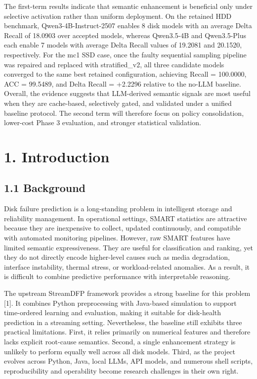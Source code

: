 \documentclass[
  11pt,
  a4paper]{article}
\begin{document}
The first-term results indicate that semantic enhancement is beneficial
only under selective activation rather than uniform deployment. On the
retained HDD benchmark, Qwen3-4B-Instruct-2507 enables 8 disk models
with an average Delta Recall of 18.0903 over accepted models, whereas
Qwen3.5-4B and Qwen3.5-Plus each enable 7 models with average Delta
Recall values of 19.2081 and 20.1520, respectively. For the mc1 SSD
case, once the faulty sequential sampling pipeline was repaired and
replaced with stratified\_v2, all three candidate models converged to
the same best retained configuration, achieving Recall = 100.0000, ACC =
99.5489, and Delta Recall = +2.2296 relative to the no-LLM baseline.
Overall, the evidence suggests that LLM-derived semantic signals are
most useful when they are cache-based, selectively gated, and validated
under a unified baseline protocol. The second term will therefore focus
on policy consolidation, lower-cost Phase 3 evaluation, and stronger
statistical validation.

\hypertarget{introduction}{%
\section{1. Introduction}\label{introduction}}

\hypertarget{background}{%
\subsection{1.1 Background}\label{background}}

Disk failure prediction is a long-standing problem in intelligent
storage and reliability management. In operational settings, SMART
statistics are attractive because they are inexpensive to collect,
updated continuously, and compatible with automated monitoring
pipelines. However, raw SMART features have limited semantic
expressiveness. They are useful for classification and ranking, yet they
do not directly encode higher-level causes such as media degradation,
interface instability, thermal stress, or workload-related anomalies. As
a result, it is difficult to combine predictive performance with
interpretable reasoning.

The upstream StreamDFP framework provides a strong baseline for this
problem {[}1{]}. It combines Python preprocessing with Java-based
simulation to support time-ordered learning and evaluation, making it
suitable for disk-health prediction in a streaming setting.
Nevertheless, the baseline still exhibits three practical limitations.
First, it relies primarily on numerical features and therefore lacks
explicit root-cause semantics. Second, a single enhancement strategy is
unlikely to perform equally well across all disk models. Third, as the
project evolves across Python, Java, local LLMs, API models, and
numerous shell scripts, reproducibility and operability become research
challenges in their own right.
\end{document}
